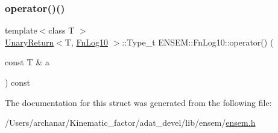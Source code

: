 \mbox{\label{structENSEM_1_1FnLog10_a391be0578edd7ffb0348e9dd601e8323}} 
\subsubsection{\texorpdfstring{operator()()}{operator()()}\hspace{0.1cm}{\footnotesize\ttfamily [2/2]}}
{\footnotesize\ttfamily template$<$class T $>$ \\
\mbox{\hyperlink{structENSEM_1_1UnaryReturn}{Unary\+Return}}$<$T, \mbox{\hyperlink{structENSEM_1_1FnLog10}{Fn\+Log10}} $>$\+::Type\+\_\+t E\+N\+S\+E\+M\+::\+Fn\+Log10\+::operator() (\begin{DoxyParamCaption}\item[{const T \&}]{a }\end{DoxyParamCaption}) const\hspace{0.3cm}{\ttfamily [inline]}}



The documentation for this struct was generated from the following file\+:\begin{DoxyCompactItemize}
\item 
/\+Users/archanar/\+Kinematic\+\_\+factor/adat\+\_\+devel/lib/ensem/\mbox{\hyperlink{lib_2ensem_2ensem_8h}{ensem.\+h}}\end{DoxyCompactItemize}
